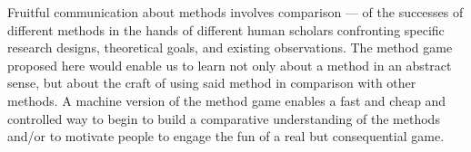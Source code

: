\documentclass[12pt]{article}
\begin{document}
Fruitful communication about methods involves comparison --- of the successes
of different methods in the hands of different human scholars confronting
specific research designs, theoretical goals, and existing observations. The
method game proposed here would enable us to learn not only about a method in
an abstract sense, but about the craft of using said method in comparison with
other methods. A machine version of the method game enables a fast and cheap
and controlled way to begin to build a comparative understanding of the
methods and/or to motivate people to engage the fun of a real but
consequential game.





\end{document}
